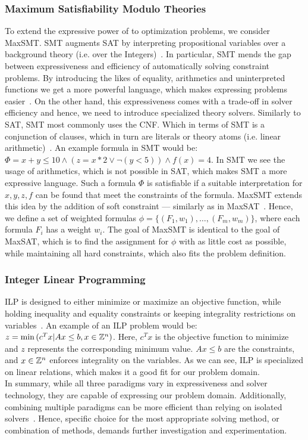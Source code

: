 \subsubsection{Maximum Satisfiability Modulo Theories}
To extend the expressive power of  to optimization problems, we consider \ac{MaxSMT}. \ac{SMT} augments \ac{SAT} by interpreting propositional variables over a background theory (i.e. over the Integers)~\cite{bib:2006-nieuwenhuis, bib:2008-marques}. In particular, \ac{SMT} mends the gap between expressiveness and efficiency of automatically solving constraint problems. By introducing the likes of equality, arithmetics and uninterpreted functions we get a more powerful language, which makes expressing problems easier~\cite{bib:2006-nieuwenhuis, bib:2007-demoura}. On the other hand, this expressiveness comes with a trade-off in solver efficiency and hence, we need to introduce specialized theory solvers. Similarly to \ac{SAT}, \ac{SMT} most commonly uses the \ac{CNF}. Which in terms of \ac{SMT} is a conjunction of clauses, which in turn are literals or theory atoms (i.e. linear arithmetic)~\cite{bib:2018-fazekas}. An example formula in \ac{SMT} would be: $\Phi = x + y \leq 10 \land (z = x * 2 \lor \lnot (y < 5)) \land f(x) = 4$. In \ac{SMT} we see the usage of arithmetics, which is not possible in \ac{SAT}, which makes \ac{SMT} a more expressive language. Such a formula $\Phi$ is satisfiable if a suitable interpretation for $x, y, z, f$ can be found that meet the constraints of the formula. \ac{MaxSMT} extends this idea by the addition of soft constraint --- similarly as in \ac{MaxSAT}~\cite{bib:2018-fazekas}. Hence, we define a set of weighted formulas $\phi = \{(F_1, w_1), \dots, (F_m, w_m)\}$, where each formula $F_i$ has a weight $w_i$. The goal of \ac{MaxSMT} is identical to the goal of \ac{MaxSAT}, which is to find the assignment for $\phi$ with as little cost as possible, while maintaining all hard constraints, which also fits the problem definition.

\subsubsection{Integer Linear Programming}
\ac{ILP} is designed to either minimize or maximize an objective function, while holding inequality and equality constraints or keeping integrality restrictions on variables~\cite{bib:1994-chaudhuri}. An example of an \ac{ILP} problem would be: $z = \min{(c^Tx | Ax \leq b, x \in \ensuremath{\mathbb{Z}}^n)}$. Here, $c^Tx$ is the objective function to minimize and $z$ represents the corresponding minimum value. $Ax \leq b$ are the constraints, and $x \in \mathbb{Z}^n$ enforces integrality on the variables. As we can see, \ac{ILP} is specialized on linear relations, which makes it a good fit for our problem domain. \\
In summary, while all three paradigms vary in expressiveness and solver technology, they are capable of expressing our problem domain. Additionally, combining multiple paradigms can be more efficient than relying on isolated solvers~\cite{bib:2025-zhang}. Hence, specific choice for the most appropriate solving method, or combination of methods, demands further investigation and experimentation.

